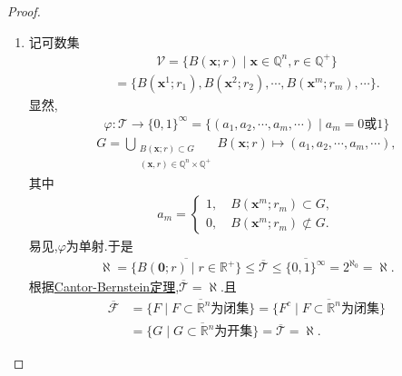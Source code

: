 \documentclass[../../main.tex]{subfiles}%
\begin{document}
\begin{proof}
\begin{enumerate}[(1)]
\item 记可数集
\begin{align*}
\mathscr{V}=\{B(\boldsymbol{x};r)\mid \boldsymbol{x}\in\mathbb{Q}^n,r\in\mathbb{Q}^+\}
\end{align*}
\begin{align*}
=\{B(\boldsymbol{x}^1;r_1),B(\boldsymbol{x}^2;r_2),\cdots,B(\boldsymbol{x}^m;r_m),\cdots\}.
\end{align*}
显然,
\begin{align*}
\varphi:\mathscr{T}\to\{0,1\}^{\infty}=\{(a_1,a_2,\cdots,a_m,\cdots)\mid a_m=0\text{或}1\}
\end{align*}
\begin{align*}
G=\bigcup\limits_{\substack{B(\boldsymbol{x};r)\subset G\\ (\boldsymbol{x},r)\in\mathbb{Q}^n\times\mathbb{Q}^+}}B(\boldsymbol{x};r)\mapsto(a_1,a_2,\cdots,a_m,\cdots),
\end{align*}
其中
\begin{align*}
a_m=\begin{cases}
1,\quad B(\boldsymbol{x}^m;r_m)\subset G,\\
0,\quad B(\boldsymbol{x}^m;r_m)\not\subset G.
\end{cases}
\end{align*}
易见,$\varphi$为单射.于是
\begin{align*}
\aleph=\overline{\{B(\boldsymbol{0};r)\mid r\in\mathbb{R}^+\}}\leqslant\overline{\mathscr{T}}\leqslant\overline{\{0,1\}^{\infty}}=2^{\aleph_0}=\aleph.
\end{align*}
根据\hyperref[Set Theory-theorem:Cantor-Bernstein定理]{Cantor-Bernstein定理},$\overline{\mathscr{T}}=\aleph$.且
\begin{align*}
\overline{\mathscr{F}}&=\overline{\{F\mid F\subset\mathbb{R}^n\text{为闭集}\}}=\overline{\{F^c\mid F\subset\mathbb{R}^n\text{为闭集}\}}
\\
&=\overline{\{G\mid G\subset\mathbb{R}^n\text{为开集}\}}=\overline{\mathscr{T}}=\aleph.
\end{align*}
\end{enumerate}
\end{proof}
\end{document}
